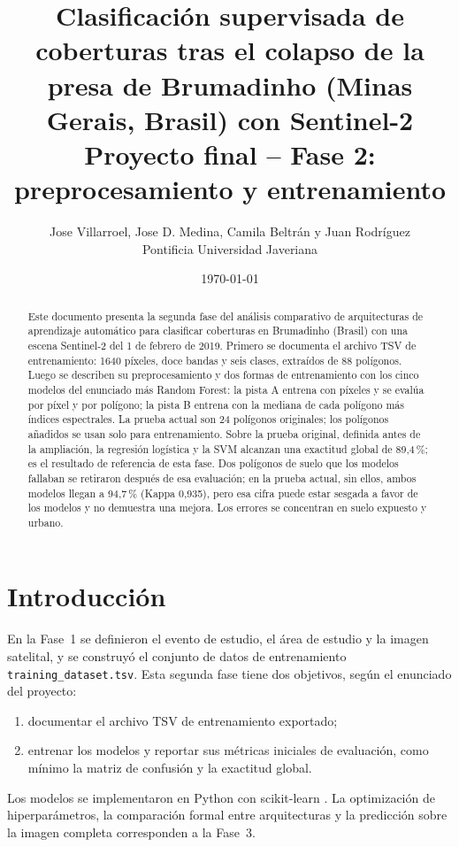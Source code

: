 \documentclass{article}
\title{Clasificación supervisada de coberturas tras el colapso de la presa de Brumadinho (Minas Gerais, Brasil) con Sentinel-2\\[0.5em]
\large Proyecto final -- Fase 2: preprocesamiento y entrenamiento}
\author{Jose Villarroel, Jose D. Medina, Camila Beltrán y Juan Rodríguez\\Pontificia Universidad Javeriana}
\date{\today}
\begin{document}
\maketitle

\begin{abstract}
Este documento presenta la segunda fase del análisis comparativo de arquitecturas de aprendizaje automático para clasificar coberturas en Brumadinho (Brasil) con una escena Sentinel-2 del 1 de febrero de 2019. Primero se documenta el archivo TSV de entrenamiento: 1640 píxeles, doce bandas y seis clases, extraídos de 88 polígonos. Luego se describen su preprocesamiento y dos formas de entrenamiento con los cinco modelos del enunciado más Random Forest: la pista A entrena con píxeles y se evalúa por píxel y por polígono; la pista B entrena con la mediana de cada polígono más índices espectrales. La prueba actual son 24 polígonos originales; los polígonos añadidos se usan solo para entrenamiento. Sobre la prueba original, definida antes de la ampliación, la regresión logística y la SVM alcanzan una exactitud global de 89{,}4\,\%; es el resultado de referencia de esta fase. Dos polígonos de suelo que los modelos fallaban se retiraron después de esa evaluación; en la prueba actual, sin ellos, ambos modelos llegan a 94{,}7\,\% (Kappa 0{,}935), pero esa cifra puede estar sesgada a favor de los modelos y no demuestra una mejora. Los errores se concentran en suelo expuesto y urbano.
\end{abstract}

\section{Introducción}
En la Fase~1 se definieron el evento de estudio, el área de estudio y la imagen satelital, y se construyó el conjunto de datos de entrenamiento \texttt{training\_dataset.tsv}. Esta segunda fase tiene dos objetivos, según el enunciado del proyecto:
\begin{enumerate}
 \item documentar el archivo TSV de entrenamiento exportado;
 \item entrenar los modelos y reportar sus métricas iniciales de evaluación, como mínimo la matriz de confusión y la exactitud global.
\end{enumerate}
Los modelos se implementaron en Python con scikit-learn \parencite{Pedregosa2011}. La optimización de hiperparámetros, la comparación formal entre arquitecturas y la predicción sobre la imagen completa corresponden a la Fase~3.
\end{document}
